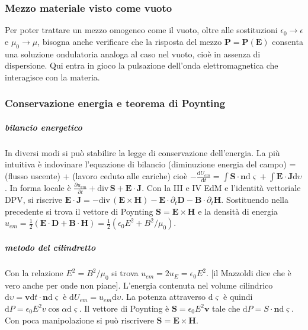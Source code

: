 \documentclass[11pt,a4paper]{article}
\newcommand{\de}{\mathrm d}
\newcommand{\fracd}[2]{\frac{\de #1}{\de #2}}
\newcommand{\fracp}[2]{\frac{\partial #1}{\partial #2}}
\newcommand{\dive}[1]{\text{div}\,#1}
\begin{document}
\subsubsection{Mezzo materiale visto come vuoto}
Per poter trattare un mezzo omogeneo come il vuoto, oltre alle sostituzioni $\epsilon_0 \to \epsilon$ e $\mu_0 \to \mu$, bisogna anche verificare che la risposta del mezzo $\mathbf P = \mathbf P(\mathbf E)$ consenta una soluzione ondulatoria analoga al caso nel vuoto, cioè in assenza di dispersione. Qui entra in gioco la pulsazione dell'onda elettromagnetica che interagisce con la materia.

\subsubsection{Conservazione energia e teorema di Poynting}
\subparagraph{bilancio energetico} In diversi modi si può stabilire la legge di conservazione dell'energia. La più intuitiva è indovinare l'equazione di bilancio (diminuzione energia del campo) = (flusso uscente) + (lavoro ceduto alle cariche) cioè $-\fracd{U_{em}}t = \int \mathbf S \cdot \mathbf n\de\varsigma + \int \mathbf E \cdot \mathbf J \de\upsilon$. In forma locale è $\fracp{u_{em}}t + \dive\mathbf S + \mathbf E \cdot \mathbf J$. Con la III e IV EdM e l'identità vettoriale DPV, si riscrive $\mathbf E \cdot \mathbf J = -\dive(\mathbf E\times\mathbf H) - \mathbf E \cdot \partial_t\mathbf D - \mathbf B \cdot \partial_t \mathbf H$. Sostituendo nella precedente si trova il vettore di Poynting $\mathbf S = \mathbf E \times \mathbf H$ e la densità di energia $u_{em} = \frac12(\mathbf E \cdot \mathbf D + \mathbf B \cdot \mathbf H) = \frac12 (\epsilon_0 E^2 + B^2/\mu_0)$.
\subparagraph{metodo del cilindretto} Con la relazione $E^2 = B^2/\mu_0$ si trova $u_{em} = 2 u_E = \epsilon_0 E^2$. [il Mazzoldi dice che è vero anche per onde non piane]. L'energia contenuta nel volume cilindrico $\de\upsilon = \mathbf v \de t \cdot \mathbf n \de\varsigma$ è $\de U_{em} = u_{em} \de\upsilon$. La potenza attraverso $\de\varsigma$ è quindi $\de P = \epsilon_0 E^2 v \cos\alpha \de\varsigma$. Il vettore di Poynting è $\mathbf S = \epsilon_0 E^2 \mathbf v$ tale che $\de P = S \cdot \mathbf n \de\varsigma$. Con poca manipolazione si può riscrivere $\mathbf S = \mathbf E \times \mathbf H$.
\end{document}
